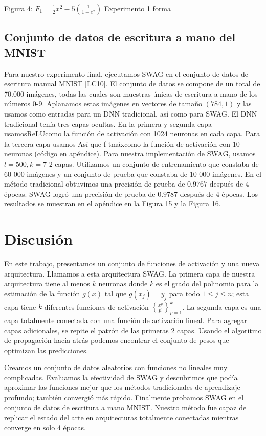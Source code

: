\documentclass[10pt]{article}
\begin{document}
Figura 4: $F_{1}=\frac{1}{2} x^{2}-5\left(\frac{1}{1+e^{x}}\right)$ Experimento 1 forma

\subsection{Conjunto de datos de escritura a mano del MNIST}
Para nuestro experimento final, ejecutamos SWAG en el conjunto de datos de escritura manual MNIST [LC10]. El conjunto de datos se compone de un total de 70.000 imágenes, todas las cuales son muestras únicas de escritura a mano de los números 0-9. Aplanamos estas imágenes en vectores de tamaño $(784,1)$ y las usamos como entradas para un DNN tradicional, así como para SWAG. El DNN tradicional tenía tres capas ocultas. En la primera y segunda capa usamosReLUcomo la función de activación con 1024 neuronas en cada capa. Para la tercera capa usamos Así que f tmáxcomo la función de activación con 10 neuronas (código en apéndice). Para nuestra implementación de SWAG,
usamos $l=500, k=7$ 2 capas. Utilizamos un conjunto de entrenamiento que constaba de 60 000 imágenes y un conjunto de prueba que constaba de 10 000 imágenes. En el método tradicional obtuvimos una precisión de prueba
de $0.9767$ después de 4 épocas. SWAG logró una precisión de prueba de $0.9787$ después de 4 épocas. Los resultados se muestran en el apéndice en la Figura 15 y la Figura 16.

\section{Discusión}
En este trabajo, presentamos un conjunto de funciones de activación y una nueva arquitectura. Llamamos a esta arquitectura SWAG. La primera capa de nuestra arquitectura tiene al menos $k$ neuronas donde $k$ es el grado
del polinomio para la estimación de la función $g(x)$ tal que $g\left(x_{j}\right)=y_{j}$ para todo $1 \leq j \leq n$; esta capa tiene $k$ diferentes funciones de activación $\left\{\frac{x^{p}}{p !}\right\}_{p=1}^{k}$. La segunda capa es una capa totalmente conectada con una función de activación lineal. Para agregar capas adicionales, se repite el patrón de las primeras 2
capas. Usando el algoritmo de propagación hacia atrás podemos encontrar el conjunto de pesos que optimizan
las predicciones.

Creamos un conjunto de datos aleatorios con funciones no lineales muy complicadas. Evaluamos la
efectividad de SWAG y descubrimos que podía aproximar las funciones mejor que los métodos tradicionales de
aprendizaje profundo; también convergió más rápido. Finalmente probamos SWAG en el conjunto de datos de
escritura a mano MNIST. Nuestro método fue capaz de replicar el estado del arte en arquitecturas totalmente
conectadas mientras converge en solo 4 épocas.
\end{document}
